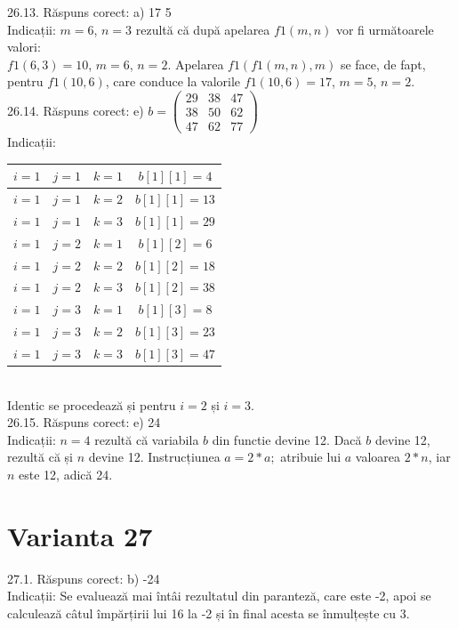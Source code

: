 26.13. Răspuns corect: a) 17 5\\
Indicații: $m=6$, $n=3$ rezultă că după apelarea $f1(m, n)$ vor fi următoarele valori:\\ $f1(6,3)=10$, $m=6$, $n=2$. Apelarea $f1(f1(m, n), m)$ se face, de fapt, pentru $f1(10,6)$, care conduce la valorile $f1(10,6)=17$, $m=5$, $n=2$.\\

26.14. Răspuns corect: e) $b=\left(\begin{array}{lll}29 & 38 & 47 \\ 38 & 50 & 62 \\ 47 & 62 & 77\end{array}\right)$\\
Indicații:\\ \begin{tabular}{|c|c|c|c|} \hline$i=1$ & $j=1$ & $k=1$ & $b[1][1]=4$ \\ \hline$i=1$ & $j=1$ & $k=2$ & $b[1][1]=13$ \\ \hline$i=1$ & $j=1$ & $k=3$ & $b[1][1]=29$ \\ \hline$i=1$ & $j=2$ & $k=1$ & $b[1][2]=6$ \\ \hline$i=1$ & $j=2$ & $k=2$ & $b[1][2]=18$ \\ \hline$i=1$ & $j=2$ & $k=3$ & $b[1][2]=38$ \\ \hline$i=1$ & $j=3$ & $k=1$ & $b[1][3]=8$ \\ \hline$i=1$ & $j=3$ & $k=2$ & $b[1][3]=23$ \\ \hline$i=1$ & $j=3$ & $k=3$ & $b[1][3]=47$ \\ \hline \end{tabular}\\ Identic se procedează și pentru $i=2$ și $i=3$.\\

26.15. Răspuns corect: e) 24\\
Indicații: $n=4$ rezultă că variabila $b$ din functie devine 12. Dacă $b$ devine 12, rezultă că și $n$ devine 12. Instrucțiunea $a=2 * a;$ atribuie lui $a$ valoarea $2 * n$, iar $n$ este 12, adică 24.\\

\section*{Varianta 27}

27.1. Răspuns corect: b) -24\\
Indicații: Se evaluează mai întâi rezultatul din paranteză, care este -2, apoi se calculează câtul împărțirii lui 16 la -2 și în final acesta se înmulțește cu 3.\\

